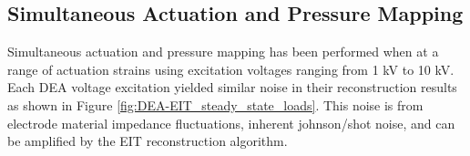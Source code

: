 
\subsection{Simultaneous Actuation and Pressure Mapping}
Simultaneous actuation and pressure mapping has been performed when at a range of actuation strains using excitation voltages ranging from 1 kV to 10 kV. Each DEA voltage excitation yielded similar noise in their reconstruction results as shown in Figure \ref{fig:DEA-EIT_steady_state_loads}. This noise is from electrode material impedance fluctuations, inherent johnson/shot noise, and can be amplified by the EIT reconstruction algorithm.

